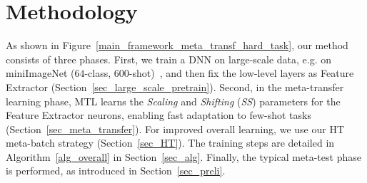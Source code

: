 
\section{Methodology}

As shown in Figure~\ref{main_framework_meta_transf_hard_task},  our method consists of three phases.
%
First, we train a DNN on large-scale data, e.g. on miniImageNet ($64$-class, $600$-shot)~\cite{VinyalsBLKW16}, and then fix the low-level layers as Feature Extractor (Section~\ref{sec_large_scale_pretrain}). 
%
Second, in the meta-transfer learning phase, MTL learns the \emph{Scaling} and \emph{Shifting} (\emph{SS}) parameters for the Feature Extractor neurons, enabling fast adaptation to few-shot tasks (Section~\ref{sec_meta_transfer}).
%
For improved overall learning, we use our HT meta-batch strategy  (Section~\ref{sec_HT}).
The training steps are detailed in Algorithm~\ref{alg_overall} in Section~\ref{sec_alg}.
%
Finally, the typical meta-test phase is performed, as introduced in Section~\ref{sec_preli}.





